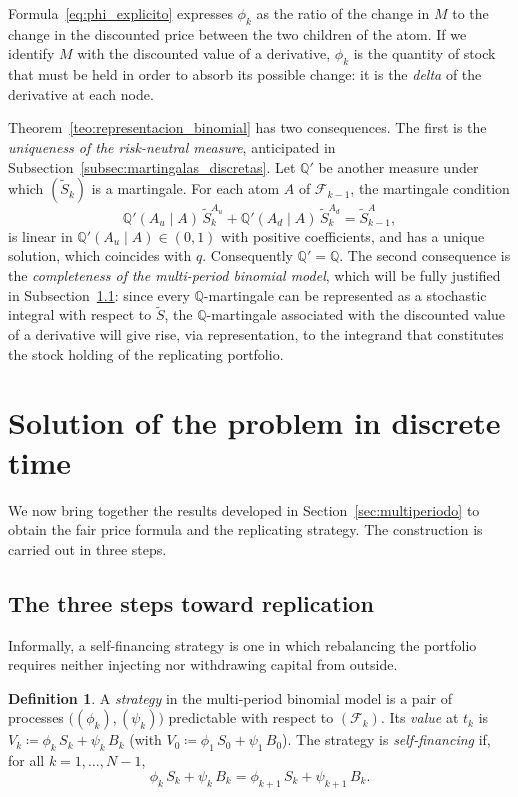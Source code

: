 \documentclass[11pt,a4paper,oneside]{report}
\theoremstyle{plain}
\theoremstyle{definition}
\newtheorem{definicion}[teorema]{Definition}
\theoremstyle{remark}
\newcommand{\Q}{\mathbb{Q}}
\newcommand{\F}{\mathcal{F}}
\newcommand{\1}{\mathbf{1}}
\newcommand{\eqdef}{\coloneqq}
\begin{document}
Formula~\eqref{eq:phi_explicito} expresses $\phi_k$ as the ratio of
the change in $M$ to the change in the discounted price between the
two children of the atom. If we identify $M$ with the discounted value
of a derivative, $\phi_k$ is the quantity of stock that must be held
in order to absorb its possible change: it is the \emph{delta} of the
derivative at each node.

Theorem~\ref{teo:representacion_binomial} has two consequences. The first is the \emph{uniqueness
of the risk-neutral measure}, anticipated in
Subsection~\ref{subsec:martingalas_discretas}. Let $\Q'$ be another measure under
which $(\widetilde S_k)$ is a martingale. For each atom $A$ of
$\F_{k-1}$, the martingale condition
\begin{equation*}
  \Q'(A_u \mid A)\, \widetilde S_k^{A_u}
  + \Q'(A_d \mid A)\, \widetilde S_k^{A_d}
  = \widetilde S_{k-1}^A,
\end{equation*}
is linear in $\Q'(A_u \mid A) \in (0, 1)$ with positive coefficients,
and has a unique solution, which coincides with $q$. Consequently
$\Q' = \Q$. The second consequence is the \emph{completeness of the
multi-period binomial model}, which will be fully justified in
Subsection~\ref{subsec:tres_pasos_discreto}: since every
$\Q$-martingale can be represented as a stochastic integral with
respect to $\widetilde S$, the $\Q$-martingale associated with the
discounted value of a derivative will give rise, via representation,
to the integrand that constitutes the stock holding of the replicating
portfolio.
\section{Solution of the problem in discrete time}
\label{sec:solucion_discreto}

We now bring together the results developed in
Section~\ref{sec:multiperiodo} to obtain the fair price formula and
the replicating strategy. The construction is carried out in three
steps.

\subsection{The three steps toward replication}
\label{subsec:tres_pasos_discreto}

Informally, a
self-financing strategy is one in which rebalancing the portfolio
requires neither injecting nor withdrawing capital from outside.

\begin{definicion}
\label{def:self_financing_discreto}
A \emph{strategy} in the multi-period binomial model is a pair of
processes $\bigl((\phi_k), (\psi_k)\bigr)$ predictable with respect to
$(\F_k)$. Its \emph{value} at $t_k$ is
$V_k \eqdef \phi_k\, S_k + \psi_k\, B_k$ (with
$V_0 \eqdef \phi_1\, S_0 + \psi_1\, B_0$). The strategy is
\emph{self-financing} if, for all $k = 1, \ldots, N - 1$,
\begin{equation}\label{eq:cond_self_financing_discreto}
  \phi_k\, S_k + \psi_k\, B_k = \phi_{k+1}\, S_k + \psi_{k+1}\, B_k.
\end{equation}
\end{definicion}
\end{document}
